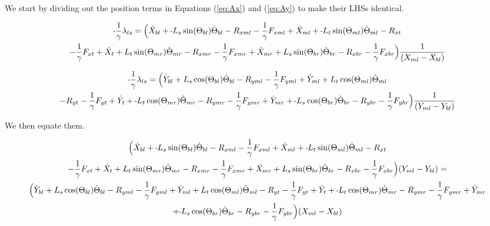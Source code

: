 \documentclass[11pt, landscape]{article}
\newcommand{\mn}{\scalebox{0.7}[1.0]{-}}
\begin{document}
We start by dividing out the position terms in Equations (\ref{eq:Ax}) and (\ref{eq:Ay}) to make their LHSs identical.

\begin{multline}
\mn\frac{1}{\gamma}\lambda_{ls} =
\Big(\dot{X}_{bl} + \mn L_{s}\sin(\Theta_{bl})\dot{\Theta}_{bl} - R_{xml} - \frac{1}{\gamma}F_{xml} + \dot{X}_{ml} + \mn L_{t}\sin(\Theta_{ml})\dot{\Theta}_{ml} - R_{xt } \\
- \frac{1}{\gamma}F_{xt } + \dot{X}_{t } + L_{t}\sin(\Theta_{mr})\dot{\Theta}_{mr} - R_{xmr}
-\frac{1}{\gamma}F_{xmr} + \dot{X}_{mr} + L_{s}\sin(\Theta_{br})\dot{\Theta}_{br} - R_{xbr} - \frac{1}{\gamma}F_{xbr}\Big)\frac{1}{(X_{ml} - X_{bl})}
\end{multline}

\begin{multline}
\mn\frac{1}{\gamma}\lambda_{ls} =
\Big( \dot{Y}_{bl} + L_{s}\cos(\Theta_{bl})\dot{\Theta}_{bl} - R_{yml} - \frac{1}{\gamma}F_{yml} + \dot{Y}_{ml} + L_{t}\cos(\Theta_{ml})\dot{\Theta}_{ml} \\
- R_{yt} - \frac{1}{\gamma}F_{yt } + \dot{Y}_{t } + \mn L_{t}\cos(\Theta_{mr})\dot{\Theta}_{mr} - R_{ymr} - \frac{1}{\gamma}F_{ymr} + \dot{Y}_{mr}
+ \mn L_{s}\cos(\Theta_{br})\dot{\Theta}_{br} - R_{ybr} - \frac{1}{\gamma}F_{ybr}\Big)\frac{1}{(Y_{ml} - Y_{bl})}
\end{multline}

We then equate them.

\begin{multline}
\Big(\dot{X}_{bl} + \mn L_{s}\sin(\Theta_{bl})\dot{\Theta}_{bl} - R_{xml} - \frac{1}{\gamma}F_{xml} + \dot{X}_{ml} + \mn L_{t}\sin(\Theta_{ml})\dot{\Theta}_{ml} - R_{xt } \\
- \frac{1}{\gamma}F_{xt } + \dot{X}_{t } + L_{t}\sin(\Theta_{mr})\dot{\Theta}_{mr} - R_{xmr}
-\frac{1}{\gamma}F_{xmr} + \dot{X}_{mr} + L_{s}\sin(\Theta_{br})\dot{\Theta}_{br} - R_{xbr} - \frac{1}{\gamma}F_{xbr}\Big)(Y_{ml} - Y_{bl}) = \\
\Big( \dot{Y}_{bl} + L_{s}\cos(\Theta_{bl})\dot{\Theta}_{bl} - R_{yml} - \frac{1}{\gamma}F_{yml} + \dot{Y}_{ml} + L_{t}\cos(\Theta_{ml})\dot{\Theta}_{ml}
- R_{yt} - \frac{1}{\gamma}F_{yt } + \dot{Y}_{t } + \mn L_{t}\cos(\Theta_{mr})\dot{\Theta}_{mr} - R_{ymr} - \frac{1}{\gamma}F_{ymr} + \dot{Y}_{mr} \\
+ \mn L_{s}\cos(\Theta_{br})\dot{\Theta}_{br} - R_{ybr} - \frac{1}{\gamma}F_{ybr}\Big)(X_{ml} - X_{bl})
\end{multline}
\end{document}
